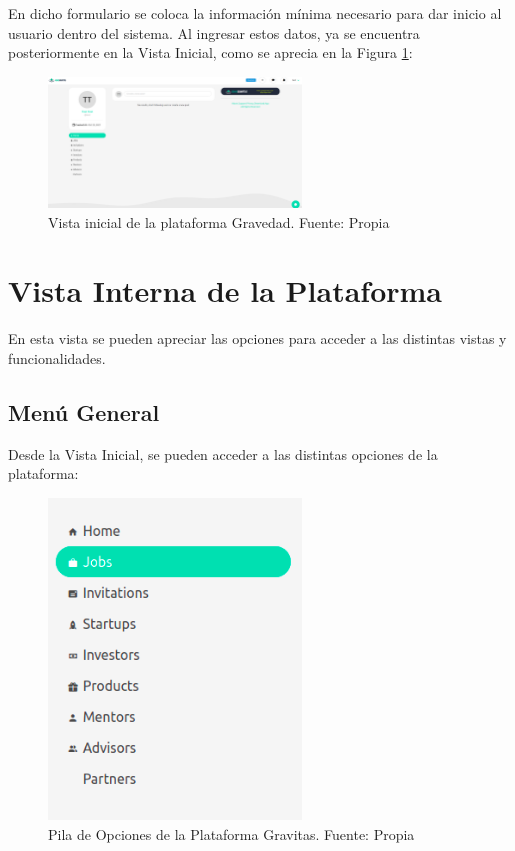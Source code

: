 En dicho formulario se coloca la información mínima necesario para dar inicio al usuario dentro del sistema. Al ingresar estos datos, ya se encuentra posteriormente en la Vista Inicial, como se aprecia en la Figura \ref{figure:homeView}:

\begin{figure}[H]
\centering
\includegraphics[width=0.60\textwidth]{img/18.png}
\caption{Vista inicial de la plataforma Gravedad. Fuente: Propia}
\label{figure:homeView}
\end{figure}

\section{Vista Interna de la Plataforma}

En esta vista se pueden apreciar las opciones para acceder a las distintas vistas y funcionalidades.

\subsection{Menú General}

Desde la Vista Inicial, se pueden acceder a las distintas opciones de la plataforma:

\begin{figure}[H]
\centering
\includegraphics[width=0.60\textwidth]{img/49.png}
\caption{Pila de Opciones de la Plataforma Gravitas. Fuente: Propia}
\label{figure:usersWorkSPref2}
\end{figure}


